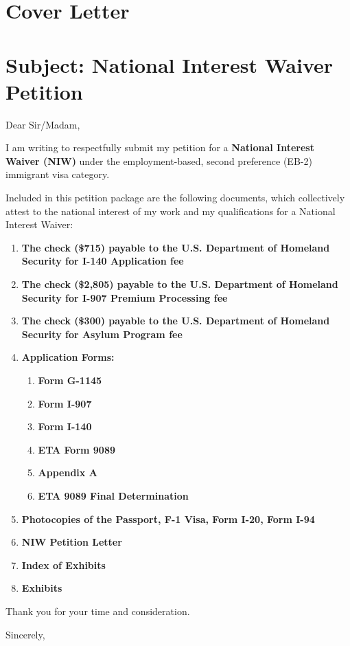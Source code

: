 \begin{center}
    \section{} %
    \section{\fontsize{20}{0}\selectfont Cover Letter}
    \section{} %
\end{center}

\section{Subject: National Interest Waiver Petition}\label{subject-national-interest-waiver-petition}

Dear Sir/Madam,

I am writing to respectfully submit my petition for a \textbf{National Interest Waiver (NIW)} under the employment-based, second preference (EB-2) immigrant visa category.

Included in this petition package are the following documents, which collectively attest to the national interest of my work and my qualifications for a National Interest Waiver:

\begin{enumerate}
\def\labelenumi{\arabic{enumi}.}
\item
  \textbf{The check (\$715) payable to the U.S. Department of Homeland
  Security for I-140 Application fee}
\item
  \textbf{The check (\$2,805) payable to the U.S. Department of Homeland
  Security for I-907 Premium Processing fee}
\item
  \textbf{The check (\$300) payable to the U.S. Department of Homeland Security
  for Asylum Program fee}
\item
  \textbf{Application Forms:}

  \begin{enumerate}
  \def\labelenumii{\alph{enumii}.}
  \item
    \textbf{Form G-1145}
  \item
    \textbf{Form I-907}
  \item
    \textbf{Form I-140}
  \item
    \textbf{ETA Form 9089}
  \item
    \textbf{Appendix A}
  \item
    \textbf{ETA 9089 Final Determination}
  \end{enumerate}
\item
  \textbf{Photocopies of the Passport, F-1 Visa, Form I-20, Form I-94}
\item
  \textbf{NIW Petition Letter}
\item
  \textbf{Index of Exhibits}
\item
  \textbf{Exhibits}
\end{enumerate}

Thank you for your time and consideration.

Sincerely,

\myname